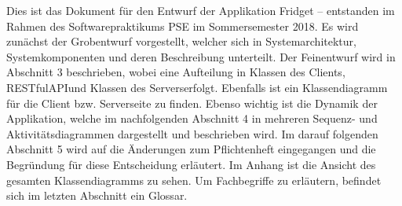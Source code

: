 Dies ist das Dokument für den Entwurf der Applikation Fridget – entstanden im Rahmen des Softwarepraktikums PSE im Sommersemester 2018.
Es wird zunächst der Grobentwurf vorgestellt, welcher sich in Systemarchitektur, Systemkomponenten und deren Beschreibung unterteilt. 
Der Feinentwurf wird in Abschnitt 3 beschrieben, wobei eine Aufteilung in \grqq Klassen des Clients\grqq, \grqq RESTfulAPI\grqq und \grqq Klassen des Servers\grqq erfolgt. Ebenfalls ist ein Klassendiagramm für die Client bzw. Serverseite zu finden. 
Ebenso wichtig ist die Dynamik der Applikation, welche im nachfolgenden Abschnitt 4 in mehreren Sequenz- und Aktivitätsdiagrammen dargestellt und beschrieben wird.  
Im darauf folgenden Abschnitt 5 wird auf die Änderungen zum Pflichtenheft eingegangen und die Begründung für diese Entscheidung erläutert.
Im Anhang ist die Ansicht des gesamten Klassendiagramms zu sehen.
Um Fachbegriffe zu erläutern, befindet sich im letzten Abschnitt ein Glossar.
